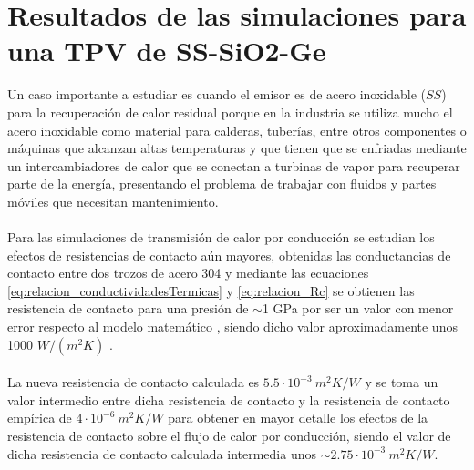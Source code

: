 \section{Resultados de las simulaciones para una TPV de SS-SiO2-Ge}
Un caso importante a estudiar es cuando el emisor es de acero inoxidable ($SS$) para la recuperación de calor residual porque en la industria se utiliza mucho el acero inoxidable como material para calderas, tuberías, entre otros componentes o máquinas que alcanzan altas temperaturas y que tienen que se enfriadas mediante un intercambiadores de calor que se conectan a turbinas de vapor para recuperar parte de la energía, presentando el problema de trabajar con fluidos y partes móviles que necesitan mantenimiento.\\\\
Para las simulaciones de transmisión de calor por conducción se estudian los efectos de resistencias de contacto aún mayores, obtenidas las conductancias de contacto entre dos trozos de acero 304 y mediante las ecuaciones \eqref{eq:relacion_conductividadesTermicas} y \eqref{eq:relacion_Rc} se obtienen las resistencia de contacto para una presión de $\sim$1 GPa por ser un valor con menor error respecto al modelo matemático \cite{experimental_Rc_SS}, siendo dicho valor aproximadamente unos 1000 $W/(m^2 K)$ .\\\\
La nueva resistencia de contacto calculada es $5.5\cdot 10^{-3} \ m^2 K/W$ y se toma un valor intermedio entre dicha resistencia de contacto y la resistencia de contacto empírica de $4\cdot 10^{-6} \ m^2 K/W$ \cite{nf_TPV_Pillars_SiO2} para obtener en mayor detalle los efectos de la resistencia de contacto sobre el flujo de calor por conducción, siendo el valor de dicha resistencia de contacto calculada intermedia unos $\sim 2.75\cdot 10^{-3} \ m^2 K/W$.
